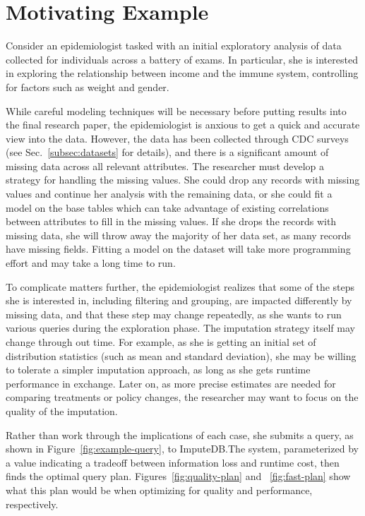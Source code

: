 \section{Motivating Example}
Consider an epidemiologist tasked with an initial
exploratory analysis of data collected for individuals across
a battery of exams. In particular, she is interested in exploring
the relationship between income and the immune system,
controlling for factors such as weight and gender.

While careful modeling techniques will be necessary before putting
results into the final research paper, the epidemiologist is anxious
to get a quick and accurate view into the data. However,
the data has been collected through CDC surveys (see Sec.~\ref{subsec:datasets} for details),
and there is a significant amount of missing data across all
relevant attributes. The researcher must develop a strategy
for handling the missing values. She could drop any records with
missing values and continue her analysis with the remaining data,
or she could fit a model on the base tables which can take advantage of existing correlations between attributes to fill in the missing values.
If she drops the records with missing data, she will throw away the majority of her data set, as many records have missing fields.
Fitting a model on the dataset will take more programming effort and may take a long time to run.

To complicate matters further, the epidemiologist realizes that
some of the steps she is interested in, including filtering and grouping,
are impacted differently by missing data, and that these step may change
repeatedly, as she wants to run various queries during the exploration phase.
The imputation strategy itself may change through out time. For example, as she is getting an initial
set of distribution statistics (such as mean and standard deviation), she may be willing to tolerate
a simpler imputation approach, as long as she gets runtime performance in exchange. Later on,
as more precise estimates are needed for comparing treatments or policy changes, the researcher
may want to focus on the quality of the imputation.

Rather than work through
the implications of each case, she submits a query, as shown in Figure~\ref{fig:example-query}, to ImputeDB.\@ The system, parameterized by a value indicating
a tradeoff between information loss and runtime cost, then finds
the optimal query plan. Figures~\ref{fig:quality-plan} and ~\ref{fig:fast-plan} show what this plan would be
when optimizing for quality and performance, respectively.

